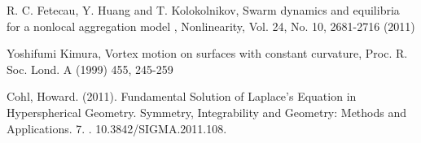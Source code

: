 \documentclass{article}
\begin{document}
\begin{thebibliography}{3}
R. C. Fetecau, Y. Huang and T. Kolokolnikov, Swarm dynamics and equilibria for a nonlocal aggregation model , Nonlinearity, Vol. 24, No. 10, 2681-2716 (2011)
 
Yoshifumi Kimura, Vortex motion on surfaces with constant curvature, Proc. R. Soc. Lond. A (1999) 455, 245-259

Cohl, Howard. (2011). Fundamental Solution of Laplace's Equation in Hyperspherical Geometry. Symmetry, Integrability and Geometry: Methods and Applications. 7. . 10.3842/SIGMA.2011.108.

\end{thebibliography}
\end{document}
